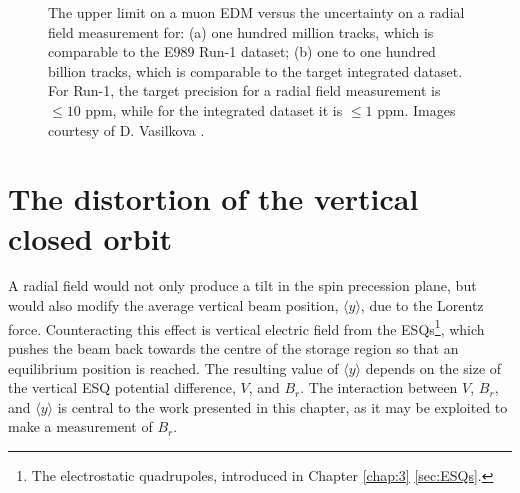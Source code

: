 \begin{figure}[t!]
{}
\caption{The upper limit on a muon EDM versus the uncertainty on a radial field measurement for: (a) one hundred million tracks, which is comparable to the E989 Run-1 dataset; (b) one to one hundred billion tracks, which is comparable to the target integrated dataset. For Run-1, the target precision for a radial field measurement is $\leq10$ ppm, while for the integrated dataset it is $\leq1$ ppm. Images courtesy of D. Vasilkova \cite{DominikaCMJuly2021}.}
\label{fig:BrUnc}
\end{figure}

\section{The distortion of the vertical closed orbit}\label{sec:VCOD}

A radial field would not only produce a tilt in the spin precession plane, but would also modify the average vertical beam position, $\langle y \rangle$, due to the Lorentz force. Counteracting this effect is vertical electric field from the ESQs\footnote{The electrostatic quadrupoles, introduced in Chapter \ref{chap:3} \ref{sec:ESQs}.}, which pushes the beam back towards the centre of the storage region so that an equilibrium position is reached. The resulting value of $\langle y \rangle$ depends on the size of the vertical ESQ potential difference, $V$, and $B_{r}$. The interaction between $V$, $B_{r}$, and $\langle y \rangle$ is central to the work presented in this chapter, as it may be exploited to make a measurement of $B_{r}$.

